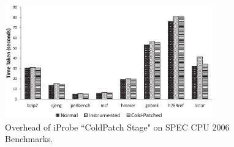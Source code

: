 




\begin{figure}[h!]
  \begin{center}
    \includegraphics[width=0.8\textwidth]{iprobe/Images/OverheadCold.eps}
    \caption{Overhead of iProbe ``ColdPatch Stage" on SPEC CPU 2006 Benchmarks.}
    \label{fig:overhead_table}
  \end{center}
\end{figure}


